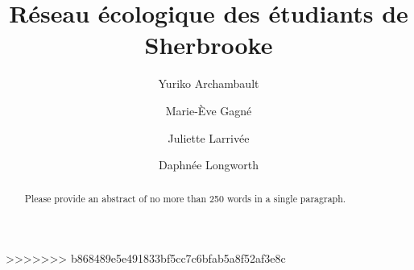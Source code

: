 \documentclass[9pt,twocolumn,twoside,]{pnas-new}
\begin{document}
>>>>>>> b868489e5e491833bf5cc7c6bfab5a8f52af3e8c


\title{Réseau écologique des étudiants de Sherbrooke}

\author[a]{Yuriko Archambault}
\author[a]{Marie-Ève Gagné}
\author[a]{Juliette Larrivée}
\author[a]{Daphnée Longworth}



\leadauthor{}

\significancestatement{}


\authorcontributions{}



\correspondingauthor{\textsuperscript{} }


\begin{abstract}
Please provide an abstract of no more than 250 words in a single
paragraph.
\end{abstract}

\end{document}
